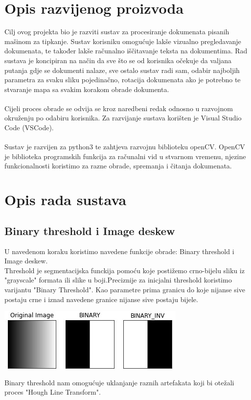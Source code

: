 \documentclass{article}
\begin{document}
\section{Opis razvijenog proizvoda}
Cilj ovog projekta bio je razviti sustav za procesiranje dokumenata pisanih mašinom za tipkanje. Sustav korisniku omogućuje lakše vizualno pregledavanje dokumenata, te također lakše računalno iščitavanje teksta na dokumentima. Rad sustava je koncipiran na način da sve što se od korisnika očekuje da valjana putanja gdje se dokumenti nalaze, sve ostalo sustav radi sam, odabir najboljih parametra za svaku sliku pojedinačno, rotacija dokumenata ako je potrebno te stvaranje mapa sa svakim korakom obrade dokumenta.\\
\\
Cijeli proces obrade se odvija se kroz naredbeni redak odnosno u razvojnom okruženju po odabiru korisnika. Za razvijanje sustava korišten je Visual Studio Code (VSCode).\\
\\
Sustav je razvijen za python3 te zahtjeva razvojnu biblioteku openCV. OpenCV je biblioteka programskih funkcija za računalni vid u stvarnom vremenu,  njezine funkcionalnosti koristimo za razne obrade, spremanja i čitanja dokumenata.

\section{Opis rada sustava}

\subsection{Binary threshold i Image deskew}

U navedenom koraku koristimo navedene funkcije obrade: Binary threshold i Image deskew.\\
Threshold je segmentacijska funckija pomoću koje postižemo crno-bijelu sliku iz "grayscale" formata ili slike u boji.Preciznije za inicjalni threshold koristimo varijantu "Binary Threshold". Kao parametre prima granicu do koje nijanse sive postaju crne i iznad navedene granice nijanse sive postaju bijele. %
\\
\begin{center}
    \includegraphics{binary_threshold.jpg}
\end{center}
\newline
Binary threshold nam omogućuje uklanjanje raznih artefakata koji bi otežali proces "Hough Line Transform".\\
\end{document}

